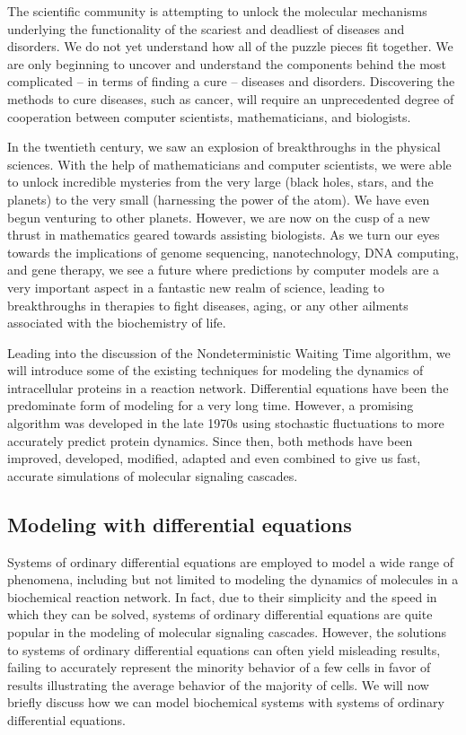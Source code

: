 \documentclass[copyright]{eptcs}
\begin{document}
The scientific community is attempting to unlock the molecular mechanisms underlying the functionality of the scariest and deadliest of diseases and disorders.  We do not yet understand how all of the puzzle pieces fit together.  We are only beginning to uncover and understand the components behind the most complicated -- in terms of finding a cure -- diseases and disorders.  Discovering the methods to cure diseases, such as cancer, will require an unprecedented degree of cooperation between computer scientists, mathematicians, and biologists.

In the twentieth century, we saw an explosion of breakthroughs in the physical sciences.  With the help of mathematicians and computer scientists, we were able to unlock incredible mysteries from the very large (black holes, stars, and the planets) to the very small (harnessing the power of the atom).  We have even begun venturing to other planets.  However, we are now on the cusp of a new thrust in mathematics geared towards assisting biologists.  As we turn our eyes towards the implications of genome sequencing, nanotechnology, DNA computing, and gene therapy, we see a future where predictions by computer models are a very important aspect in a fantastic new realm of science, leading to breakthroughs in therapies to fight diseases, aging, or any other ailments associated with the biochemistry of life.

Leading into the discussion of the Nondeterministic Waiting Time algorithm, we will introduce some of the existing techniques for modeling the dynamics of intracellular proteins in a reaction network.  Differential equations have been the predominate form of modeling for a very long time.  However, a promising algorithm was developed in the late 1970s using stochastic fluctuations to more accurately predict protein dynamics.  Since then, both methods have been improved, developed, modified, adapted and even combined to give us fast, accurate simulations of molecular signaling cascades.

\subsection{Modeling with differential equations}
Systems of ordinary differential equations are employed to model a wide range of phenomena, including but not limited to modeling the dynamics of molecules in a biochemical reaction network.  In fact, due to their simplicity and the speed in which they can be solved, systems of ordinary differential equations are quite popular in the modeling of molecular signaling cascades.  However, the solutions to systems of ordinary differential equations can often yield misleading results, failing to accurately represent the minority behavior of a few cells in favor of results illustrating the average behavior of the majority of cells. We will now briefly discuss how we can model biochemical systems with systems of ordinary differential equations.
\end{document}
